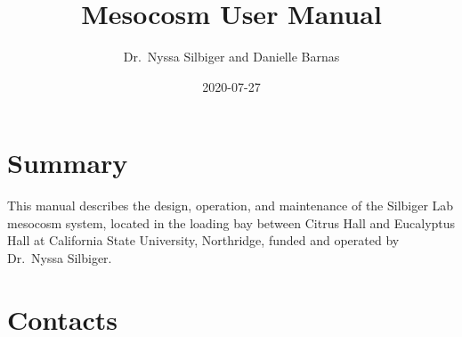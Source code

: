 \documentclass[]{book}
\title{Mesocosm User Manual}
\author{Dr.~Nyssa Silbiger and Danielle Barnas}
\date{2020-07-27}
\begin{document}
\maketitle

{
\setcounter{tocdepth}{1}
\tableofcontents
}
\chapter{Summary}\label{summary}

This manual describes the design, operation, and maintenance of the
Silbiger Lab mesocosm system, located in the loading bay between Citrus
Hall and Eucalyptus Hall at California State University, Northridge,
funded and operated by Dr.~Nyssa Silbiger.

\chapter{Contacts}\label{contacts}
\end{document}
